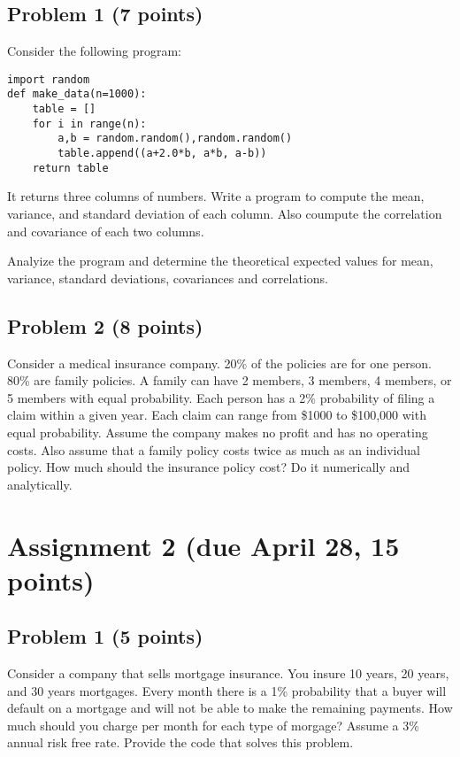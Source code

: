 \documentclass[12pt]{article}
\begin{document}
\subsection{Problem 1 (7 points)}

Consider the following program:

\begin{verbatim}
import random
def make_data(n=1000):
    table = []
    for i in range(n):
        a,b = random.random(),random.random()
        table.append((a+2.0*b, a*b, a-b))
    return table
\end{verbatim}

It returns three columns of numbers. Write a program to compute the mean, variance, and standard deviation of each column. Also coumpute the correlation and covariance of each two columns.

Analyize the program and determine the theoretical expected values for mean, variance, standard deviations, covariances and correlations.

\subsection{Problem 2 (8 points)}

Consider a medical insurance company. 20\% of the policies are for one person. 80\% are family policies. A family can have 2 members, 3 members, 4 members, or 5 members with equal probability. Each person has a 2\% probability of filing a claim within a given year. Each claim can range from \$1000 to \$100,000 with equal probability. Assume the company makes no profit and has no operating costs. Also assume that a family policy costs twice as much as an individual policy. How much should the insurance policy cost? Do it numerically and analytically.

\section{Assignment 2 (due April 28, 15 points)}

\subsection{Problem 1 (5 points)}

Consider a company that sells mortgage insurance. You insure 10 years, 20 years, and 30 years mortgages. Every month there is a 1\% probability that a buyer will default on a mortgage and will not be able to make the remaining payments. How much should you charge per month for each type of morgage? Assume a 3\% annual risk free rate. Provide the code that solves this problem.
\end{document}
